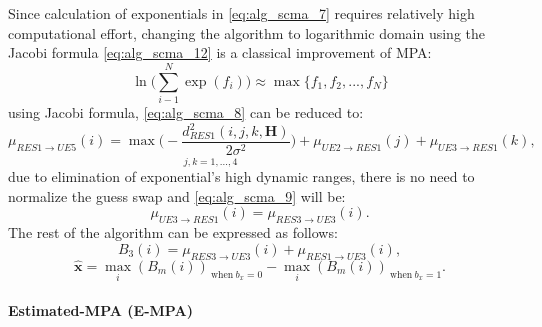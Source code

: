Since calculation of exponentials in \eqref{eq:alg_scma_7} requires relatively
high computational effort, changing the algorithm to logarithmic domain using
the Jacobi formula \eqref{eq:alg_scma_12} is a classical improvement of MPA:
\begin{equation}
  \label{eq:alg_scma_12}
  \ln \Bigg( \sum\limits_{i-1}^N\exp(f_i) \Bigg) \approx \max\{f_1,f_2,...,f_N\}
\end{equation}
using Jacobi formula, \eqref{eq:alg_scma_8} can be reduced to:
\begin{equation}
  \label{eq:alg_scma_13}
  \mu_{RES1 \rightarrow UE5}(i) = \underset{j,k=1,...,4}
  {\max \Bigg(-\frac{d_{RES1}^2(i,j,k,\bm{H})}{2\sigma^2} \Bigg)} +
  \mu_{UE2 \rightarrow RES1}(j) + \mu_{UE3 \rightarrow RES1}(k),
\end{equation}
due to elimination of exponential's high dynamic ranges, there is no need to
normalize the guess swap and \eqref{eq:alg_scma_9} will be:
\begin{equation}
  \label{eq:alg_scma_14}
  \mu_{UE3 \rightarrow RES1}(i) = \mu_{RES3 \rightarrow UE3}(i).
\end{equation}
The rest of the algorithm can be expressed as follows:
\begin{equation}
  \label{eq:alg_scma_15}
  B_3(i) = \mu_{RES3 \rightarrow UE3}(i) + \mu_{RES1 \rightarrow UE3}(i),
\end{equation}
\begin{equation}
  \label{eq:alg_scma_16}
  \bm{\hat{x}} = \max_i(B_m(i))_{~\text{when}~b_x=0} - \max_i(B_m(i))_{~\text{when}~b_x=1}.
\end{equation}

\paragraph{Estimated-MPA (E-MPA)}

